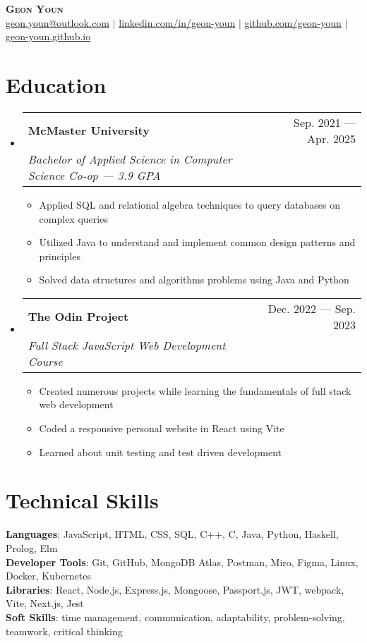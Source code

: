 \documentclass[letterpaper,11pt]{article}
\makeatletter
\newcommand{\resumeItem}[1]{
	\item\small{
		{#1 \vspace{-2pt}}
	}
}
\newcommand{\resumeSubheading}[4]{
	\vspace{-2pt}\item
	\begin{tabular*}{0.97\textwidth}[t]{l@{\extracolsep{\fill}}r}
		\textbf{#1} & #2 \\
		\textit{\small#3} & \textit{\small #4} \\
	\end{tabular*}\vspace{-7pt}
}
\newcommand{\resumeSubHeadingListStart}{\begin{itemize}[leftmargin=0.15in,
			label={}]}
\newcommand{\resumeSubHeadingListEnd}{\end{itemize}}
\newcommand{\resumeItemListStart}{\begin{itemize}}
\newcommand{\resumeItemListEnd}{\end{itemize}\vspace{-5pt}}
\makeatother
\begin{document}
\begin{center}
	\textbf{\Huge \scshape Geon Youn} \\ \vspace{1pt}
	\small
	\href{mailto:geon.youn@outlook.com}{\underline{geon.youn@outlook.com}}
	$|$
	\href{https://linkedin.com/in/geon-youn}{\underline{linkedin.com/in/geon-youn}}
	$|$
	\href{https://github.com/geon-youn}{\underline{github.com/geon-youn}}
  $|$
  \href{https://geon-youn.github.io/}{\underline{geon-youn.github.io}}
\end{center}

\section{Education}
\resumeSubHeadingListStart
\resumeSubheading
{McMaster University}{Sep. 2021 --- Apr. 2025}
{Bachelor of Applied Science in Computer Science Co-op --- 3.9 GPA}{}
\resumeItemListStart
\resumeItem{Applied SQL and relational algebra techniques to query databases on complex queries}
\resumeItem{Utilized Java to understand and implement common design patterns and principles}
\resumeItem{Solved data structures and algorithms problems using Java and Python}
\resumeItemListEnd
\resumeSubheading
{The Odin Project}{Dec. 2022 --- Sep. 2023}
{Full Stack JavaScript Web Development Course}{}
\resumeItemListStart
\resumeItem{Created numerous projects while learning the fundamentals of full stack web development}
\resumeItem{Coded a responsive personal website in React using Vite}
\resumeItem{Learned about unit testing and test driven development}
\resumeItemListEnd
\resumeSubHeadingListEnd

\section{Technical Skills}
\begin{itemize}[leftmargin=0.15in, label={}]
	\small{\item{
		            \textbf{Languages}{: JavaScript, HTML, CSS, SQL, C++, C, Java, Python, Haskell,
			            Prolog, Elm} \\
		            \textbf{Developer Tools}{: Git, GitHub, MongoDB Atlas, Postman, Miro, Figma, Linux, Docker, Kubernetes} \\
		            \textbf{Libraries}{: React, Node.js, Express.js, Mongoose, Passport.js, JWT, webpack, Vite, Next.js, Jest} \\
		            \textbf{Soft Skills}{: time management,
			            communication, adaptability,
			            problem-solving, teamwork, critical thinking}
		      }}
\end{itemize}
\end{document}
